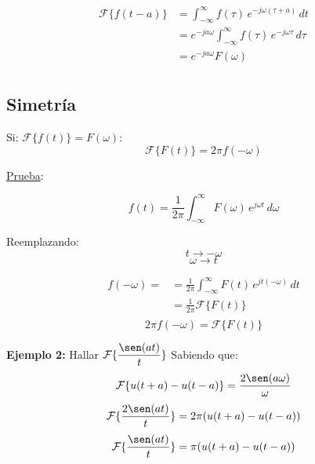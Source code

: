 \begin{equation*}
\begin{split}
    \mathcal{F}\{f(t-a)\}
        &=\int_{-\infty}^\infty f(\tau)\,e^{-j\omega(\tau+a)}\,dt\\
        &=e^{-ja\omega}\int_{-\infty}^\infty f(\tau)\,e^{-j\omega\tau}\,d\tau\\
        &=e^{-ja\omega}F(\omega)\\
\end{split}
\end{equation*}

\subsection{Simetría}
Si: $\mathcal{F}\{f(t)\}=F(\omega)$:
\begin{equation}
    \mathcal{F}\{F(t)\}=2\pi f(-\omega)
\end{equation}

\underline{Prueba}:

\begin{equation*}
    f(t)=\frac{1}{2\pi}\int_{-\infty}^\infty F(\omega)\,e^{j\omega t}\,d\omega
\end{equation*}

Reemplazando:
\begin{equation*}
    t\to-\omega
\end{equation*}
\begin{equation*}
    \omega\to t
\end{equation*}

\begin{equation*}
\begin{split}
    f(-\omega)=
        &=\frac{1}{2\pi}\int_{-\infty}^\infty F(t)\,e^{jt(-\omega)}\,dt\\
        &=\frac{1}{2\pi}\mathcal{F}\{F(t)\}\\
\end{split}
\end{equation*}
\begin{equation*}
    2\pi f(-\omega)=\mathcal{F}\{F(t)\}
\end{equation*}

\textbf{Ejemplo 2:} Hallar $\mathcal{F}\{\dfrac{\sen(at)}{t}\}$
Sabiendo que:
\begin{equation*}
    \mathcal{F}\{u(t+a)-u(t-a)\}=\dfrac{2\sen(a\omega)}{\omega}
\end{equation*}
\begin{equation*}
    \mathcal{F}\{\dfrac{2\sen(at)}{t}\}=2\pi(u(t+a)-u(t-a))
\end{equation*}
\begin{equation}
    \mathcal{F}\{\dfrac{\sen(at)}{t}\}=\pi(u(t+a)-u(t-a))
\end{equation}


